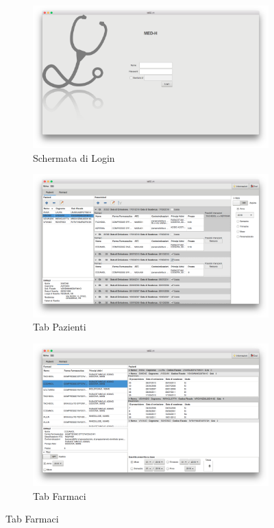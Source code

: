 \documentclass[a4paper, 11pt]{article}
\begin{document}
\begin{figure}[H]
	\begin{subfigure}[t]{\textwidth}
		\centering
		\includegraphics[height=0.3\textheight]{login}
		\caption{Schermata di Login}
	\end{subfigure}
\begin{subfigure}[b]{\textwidth}
	\centering
	\includegraphics[height=0.3\textheight]{pazienti}
	\caption{Tab Pazienti}
\end{subfigure}
\begin{subfigure}[b]{\textwidth}
	\centering
	\includegraphics[height=0.3\textheight]{farmaci}
	\caption{Tab Farmaci}
\end{subfigure}
\end{figure}
\end{document}

